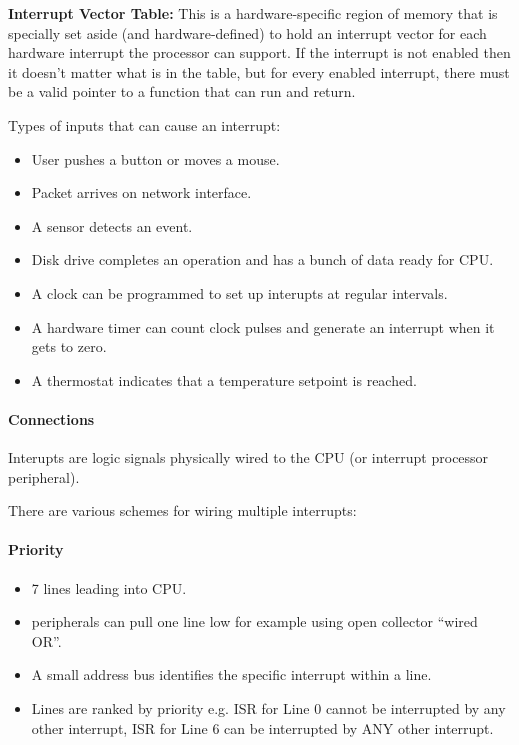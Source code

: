 {\bf Interrupt Vector Table:}  This is a hardware-specific region of memory that is specially set aside (and hardware-defined) to hold an interrupt vector for each hardware interrupt the processor can support.   If the interrupt is not enabled then it doesn’t matter what is in the table, but for every enabled interrupt, there must be a valid pointer to a function that can run and return. 
 

Types of inputs that can cause an interrupt:
\begin{itemize}
        \item User pushes a button or moves a mouse.
        \item Packet arrives on network interface.
        \item A sensor detects an event.
        \item Disk drive
 completes an operation and has a bunch of data ready for CPU.	%
        \item A clock
 can be programmed to set up interupts at regular intervals.	%
        \item A hardware timer
 can count clock pulses and generate an interrupt when it gets to zero.	%
        \item A thermostat
 indicates that a temperature setpoint is reached.	%
\end{itemize}


\paragraph{Connections}

Interupts are logic signals physically wired to the CPU
(or interrupt processor peripheral).	%

There are various schemes for wiring multiple interrupts:

\paragraph{Priority}

\begin{itemize}
        \item 7 lines leading into CPU.
        \item peripherals can pull one line low
 for example using open collector ``wired OR''.	%
        \item A small address bus identifies the specific
        interrupt within a line.
        \item Lines are ranked by priority
 e.g. ISR for Line 0 cannot be interrupted by any other interrupt,	%
ISR for Line 6 can be interrupted by ANY other interrupt.	%
\end{itemize}

